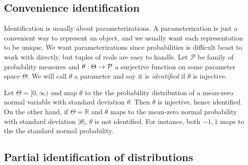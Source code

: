 \subsection{Convenience identification}

Identification is usually about parameterizations. A parameterization
is just a convenient way to represent an object, and we usually want
each representation to be unique. We want parameterizations since
probabilities is difficult beast to work with directly, but tuples
of reals are easy to handle. Let $\mathcal{P}$ be family of probability
measures and $\theta:\text{\ensuremath{\Theta\to\mathcal{P}}}$ a
surjective function on some parameter space $\Theta$. We will call
$\theta$ a parameter and say it is\emph{ identified }if $\theta$
is injective. 
\begin{example}
\label{exa:normal unidentified}Let $\Theta=[0,\infty)$ and map $\theta$
to the the probability distribution of a mean-zero normal variable
with standard deviation $\theta$. Then $\theta$ is injective, hence
identified. On the other hand, if $\Theta=\mathbb{R}$ and $\theta$
maps to the mean-zero normal probability with standard deviation $|\theta|$,
$\theta$ is not identified. For instance, both $-1,1$ maps to the
the standard normal probability.
\end{example}


\subsection{Partial identification of distributions}


